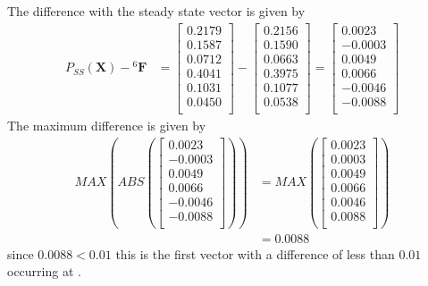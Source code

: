 \documentclass[a4paper,10pt]{article}
\newcommand{\matfin}[1]{\ensuremath{{^{#1}}{\mathbf{F}}}}
\begin{document}
\newline\noindent\newline\noindent
The difference with the steady state vector is given by 
\begin{equation*}
\begin{split}
{P_{SS}\left(\mathbf{X}\right)} - {\matfin{6}} &=
\left[\begin{array}{c}
0.2179\\
0.1587\\
0.0712\\
0.4041\\
0.1031\\
0.0450\\
\end{array}\right]
-
\left[\begin{array}{c}
0.2156\\
0.1590\\
0.0663\\
0.3975\\
0.1077\\
0.0538\\
\end{array}\right]
=
\left[\begin{array}{r}
0.0023\\
-0.0003\\
0.0049\\
0.0066\\
-0.0046\\
-0.0088\\
\end{array}\right]
\end{split}
\end{equation*}
\newline\noindent\newline\noindent
The maximum difference is given by
\begin{equation*}
\begin{split}
MAX\left({ABS\left({\left[\begin{array}{r}
0.0023\\
-0.0003\\
0.0049\\
0.0066\\
-0.0046\\
-0.0088\\
\end{array}\right]}\right)}\right) &=
MAX\left({\left[\begin{array}{r}
0.0023\\
0.0003\\
0.0049\\
0.0066\\
0.0046\\
0.0088\\
\end{array}\right]}\right)\\
&=0.0088
\end{split}
\end{equation*}
\newline\noindent\newline\noindent
since $0.0088 < 0.01$ this is the first vector with a difference of less than $0.01$ occurring at .
\end{document}
